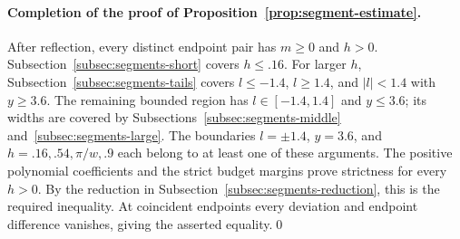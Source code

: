 \paragraph{Completion of the proof of Proposition~\ref{prop:segment-estimate}.}
After reflection, every distinct endpoint pair has $m\ge0$ and $h>0$.
Subsection~\ref{subsec:segments-short} covers $h\le.16$. For larger $h$,
Subsection~\ref{subsec:segments-tails} covers $l\le-1.4$, $l\ge1.4$, and
$|l|<1.4$ with $y\ge3.6$. The remaining bounded region has
$l\in[-1.4,1.4]$ and $y\le3.6$; its widths are covered by
Subsections~\ref{subsec:segments-middle} and~\ref{subsec:segments-large}.
The boundaries $l=\pm1.4$, $y=3.6$, and
$h=.16,.54,\pi/w,.9$ each belong to at least one of these arguments.
The positive polynomial coefficients and the strict budget margins
prove strictness for every $h>0$. By the reduction in
Subsection~\ref{subsec:segments-reduction}, this is the required inequality.
At coincident endpoints every deviation and endpoint difference
vanishes, giving the asserted equality.\qed
